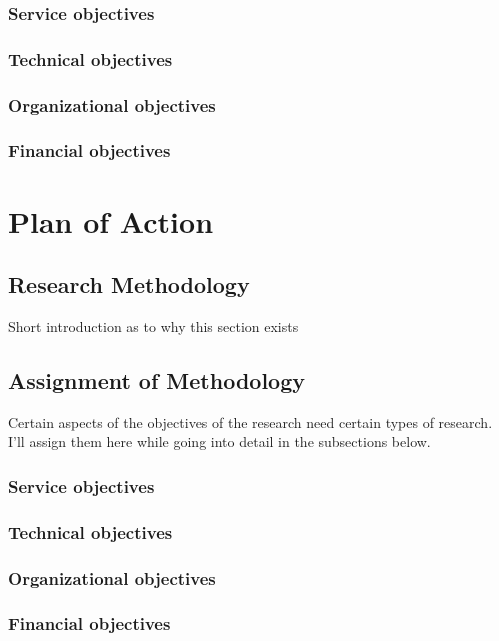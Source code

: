 \documentclass[signatures]{Thesis}
\begin{document}
  	\subsection{Service objectives}
    \subsection{Technical objectives}
    \subsection{Organizational objectives}
    \subsection{Financial objectives}



\chapter{Plan of Action}
  	\section{Research Methodology}
  	Short introduction as to why this section exists
  	\section{Assignment of Methodology}
    Certain aspects of the objectives of the research need certain types of research. I'll assign them here while going into detail in the subsections below.
	    \subsection{Service objectives}
	    \subsection{Technical objectives}
	    \subsection{Organizational objectives}
	    \subsection{Financial objectives}
\end{document}

